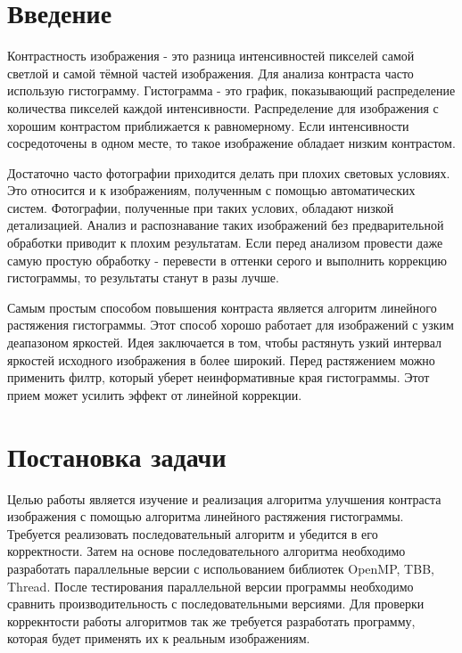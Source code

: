 \documentclass{report}
\begin{document}
	\tableofcontents

	\newpage
	

	\section*{Введение}
	\par Контрастность изображения - это разница интенсивностей пикселей самой светлой и самой тёмной частей изображения. Для анализа контраста часто использую гистограмму. Гистограмма - это график, показывающий распределение количества пикселей каждой интенсивности. Распределение для изображения с хорошим контрастом приближается к равномерному. Если интенсивности сосредоточены в одном месте, то такое изображение обладает низким контрастом.
	
	\par Достаточно часто фотографии приходится делать при плохих световых условиях. Это относится и к изображениям, полученным с помощью автоматических систем. Фотографии, полученные при таких услових, обладают низкой детализацией. Анализ и распознавание таких изображений без предварительной обработки приводит к плохим результатам. Если перед анализом провести даже самую простую обработку - перевести в оттенки серого и выполнить коррекцию гистограммы, то результаты станут в разы лучше.
	
	\par Самым простым способом повышения контраста является алгоритм линейного растяжения гистограммы. Этот способ хорошо работает для изображений с узким деапазоном яркостей. Идея заключается в том, чтобы растянуть узкий интервал яркостей исходного изображения в более широкий. Перед растяжением можно применить филтр, который уберет неинформативные края гистограммы. Этот прием может усилить эффект от линейной коррекции.
	
	\newpage
    \section*{Постановка задачи}
    \par Целью работы является изучение и реализация алгоритма улучшения контраста изображения с помощью алгоритма линейного растяжения гистограммы. Требуется реализовать последовательный алгоритм и убедится в его корректности. Затем на основе последовательного алгоритма необходимо разработать параллельные версии с испольованием библиотек OpenMP, TBB, Thread. После тестирования параллельной версии программы необходимо сравнить производительность с последовательными версиями. Для проверки коррекнтости работы алгоритмов так же требуется разработать программу, которая будет применять их к реальным изображениям.
    
\end{document}
